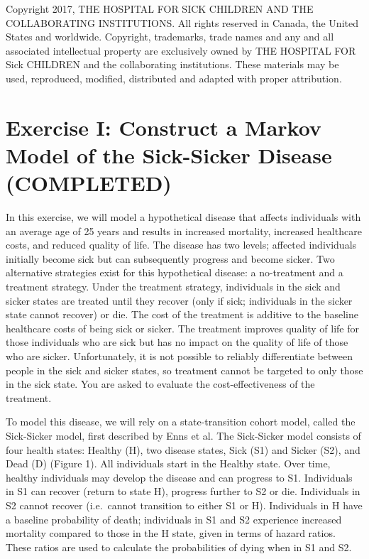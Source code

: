 \documentclass[]{article}
\begin{document}
Copyright 2017, THE HOSPITAL FOR SICK CHILDREN AND THE COLLABORATING
INSTITUTIONS. All rights reserved in Canada, the United States and
worldwide. Copyright, trademarks, trade names and any and all associated
intellectual property are exclusively owned by THE HOSPITAL FOR Sick
CHILDREN and the collaborating institutions. These materials may be
used, reproduced, modified, distributed and adapted with proper
attribution.

\section{Exercise I: Construct a Markov Model of the Sick-Sicker Disease
(COMPLETED)}\label{exercise-i-construct-a-markov-model-of-the-sick-sicker-disease-completed}

In this exercise, we will model a hypothetical disease that affects
individuals with an average age of 25 years and results in increased
mortality, increased healthcare costs, and reduced quality of life. The
disease has two levels; affected individuals initially become sick but
can subsequently progress and become sicker. Two alternative strategies
exist for this hypothetical disease: a no-treatment and a treatment
strategy. Under the treatment strategy, individuals in the sick and
sicker states are treated until they recover (only if sick; individuals
in the sicker state cannot recover) or die. The cost of the treatment is
additive to the baseline healthcare costs of being sick or sicker. The
treatment improves quality of life for those individuals who are sick
but has no impact on the quality of life of those who are sicker.
Unfortunately, it is not possible to reliably differentiate between
people in the sick and sicker states, so treatment cannot be targeted to
only those in the sick state. You are asked to evaluate the
cost-effectiveness of the treatment.

To model this disease, we will rely on a state-transition cohort model,
called the Sick-Sicker model, first described by Enns et al. The
Sick-Sicker model consists of four health states: Healthy (H), two
disease states, Sick (S1) and Sicker (S2), and Dead (D) (Figure 1). All
individuals start in the Healthy state. Over time, healthy individuals
may develop the disease and can progress to S1. Individuals in S1 can
recover (return to state H), progress further to S2 or die. Individuals
in S2 cannot recover (i.e.~cannot transition to either S1 or H).
Individuals in H have a baseline probability of death; individuals in S1
and S2 experience increased mortality compared to those in the H state,
given in terms of hazard ratios. These ratios are used to calculate the
probabilities of dying when in S1 and S2.
\end{document}
